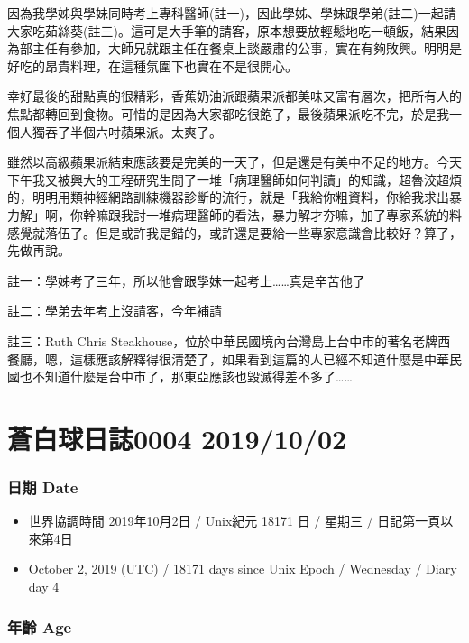 \documentclass[
]{article}
\providecommand{\tightlist}{%
  \setlength{\itemsep}{0pt}\setlength{\parskip}{0pt}}
\begin{document}
因為我學姊與學妹同時考上專科醫師(註一)，因此學姊、學妹跟學弟(註二)一起請大家吃茹絲葵(註三)。這可是大手筆的請客，原本想要放輕鬆地吃一頓飯，結果因為部主任有參加，大師兄就跟主任在餐桌上談嚴肅的公事，實在有夠敗興。明明是好吃的昂貴料理，在這種氛圍下也實在不是很開心。

幸好最後的甜點真的很精彩，香蕉奶油派跟蘋果派都美味又富有層次，把所有人的焦點都轉回到食物。可惜的是因為大家都吃很飽了，最後蘋果派吃不完，於是我一個人獨吞了半個六吋蘋果派。太爽了。

雖然以高級蘋果派結束應該要是完美的一天了，但是還是有美中不足的地方。今天下午我又被興大的工程研究生問了一堆「病理醫師如何判讀」的知識，超魯洨超煩的，明明用類神經網路訓練機器診斷的流行，就是「我給你粗資料，你給我求出暴力解」啊，你幹嘛跟我討一堆病理醫師的看法，暴力解才夯嘛，加了專家系統的料感覺就落伍了。但是或許我是錯的，或許還是要給一些專家意識會比較好？算了，先做再說。

註一：學姊考了三年，所以他會跟學妹一起考上\ldots\ldots 真是辛苦他了

註二：學弟去年考上沒請客，今年補請

註三：Ruth Chris
Steakhouse，位於中華民國境內台灣島上台中市的著名老牌西餐廳，嗯，這樣應該解釋得很清楚了，如果看到這篇的人已經不知道什麼是中華民國也不知道什麼是台中市了，那東亞應該也毀滅得差不多了\ldots\ldots{}

\hypertarget{ux84bcux767dux7403ux65e5ux8a8c0004-20191002}{%
\section{蒼白球日誌0004
2019/10/02}\label{ux84bcux767dux7403ux65e5ux8a8c0004-20191002}}

\hypertarget{ux65e5ux671f-date-3}{%
\subsubsection{日期 Date}\label{ux65e5ux671f-date-3}}

\begin{itemize}
\tightlist
\item
  世界協調時間 2019年10月2日 / Unix紀元 18171 日 / 星期三 /
  日記第一頁以來第4日
\item
  October 2, 2019 (UTC) / 18171 days since Unix Epoch / Wednesday /
  Diary day 4
\end{itemize}

\hypertarget{ux5e74ux9f61-age-3}{%
\subsubsection{年齡 Age}\label{ux5e74ux9f61-age-3}}
\end{document}
